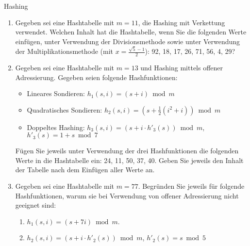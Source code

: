 \documentclass[11pt,a4paper]{article}
\begin{document}
\thispagestyle{empty}

\newcommand{\quotes}[1]{\glqq{}#1\grqq{}}




\begin{aufgabe}{1}{Hashing}
    \begin{enumerate}
        \item Gegeben sei eine Hashtabelle mit $m = 11$, die Hashing mit Verkettung verwendet.
        Welchen Inhalt hat die Hashtabelle, wenn Sie die folgenden Werte einfügen, unter Verwendung der Divisionsmethode sowie unter Verwendung der Multiplikationsmethode (mit $x = \frac{\sqrt{5} - 1}{2}$):
        92, 18, 17, 26, 71, 56, 4, 29?
        \item Gegeben sei eine Hashtabelle mit $m = 13$ und Hashing mittels offener Adressierung.
        Gegeben seien folgende Hashfunktionen:
        \begin{itemize}
            \item Lineares Sondieren: $h_1(s, i) = (s + i) \bmod m$
            \item Quadratisches Sondieren: $h_2(s, i) = (s + \frac{1}{2} (i^2 + i)) \bmod m$
            \item Doppeltes Hashing: $h_3(s, i) = (s + i \cdot h'_3(s)) \bmod m$, $h'_3(s) = 1 + s \bmod 7$
        \end{itemize}
        Fügen Sie jeweils unter Verwendung der drei Hashfunktionen die folgenden Werte in die Hashtabelle ein:
        24, 11, 50, 37, 40.
        Geben Sie jeweils den Inhalt der Tabelle nach dem Einfügen aller Werte an.
        \item
        \hard Gegeben sei eine Hashtabelle mit $m = 77$.
        Begründen Sie jeweils für folgende Hashfunktionen, warum sie bei Verwendung von offener Adressierung nicht geeignet sind:
        \begin{enumerate}[label=\roman*)]
            \item $h_1(s, i) = (s + 7i) \bmod{m}$.
            \item $h_2(s, i) = (s + i \cdot h'_2(s)) \bmod{m}$, $h'_2(s) = s \bmod 5$

\end{enumerate}
\end{enumerate}
\end{aufgabe}
\end{document}
